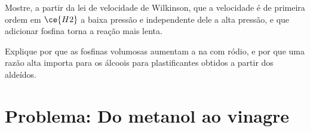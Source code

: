 \begin{exercise}[$\star\star\star$]\label{exo:b3:homogeneous-catalysis:11}
Mostre, a partir da lei de velocidade de Wilkinson, que a velocidade é de primeira ordem em $\ce{H2}$ a baixa pressão
e independente dele a alta pressão, e que adicionar fosfina torna a
reação mais lenta.
\end{exercise}

\begin{exercise}[$\star\star\star$]\label{exo:b3:homogeneous-catalysis:12}
Explique por que as fosfinas volumosas aumentam a  na 
com ródio, e por que uma razão alta importa para os álcoois para plastificantes obtidos
a partir dos aldeídos.
\end{exercise}

\section{Problema: Do metanol ao vinagre}

